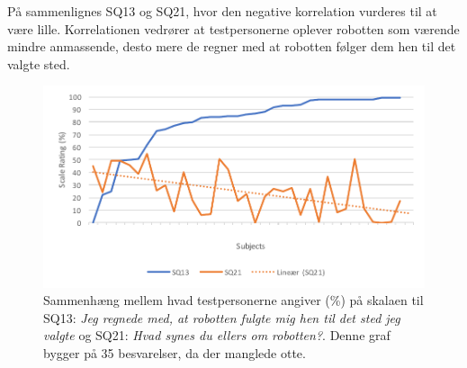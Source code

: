 \noindent
%
På  sammenlignes SQ13 og SQ21, hvor den negative korrelation vurderes til at være lille. Korrelationen vedrører at testpersonerne oplever robotten som værende mindre anmassende, desto mere de regner med at robotten følger dem hen til det valgte sted.
%
\begin{figure}[H]
	\centering
	\includegraphics[width=\textwidth]{Figure/Korrelationsgrafer/SQ13+SQ21}
	\caption{Sammenhæng mellem hvad testpersonerne angiver (\%) på skalaen til SQ13: \textit{Jeg regnede med, at robotten fulgte mig hen til det sted jeg valgte} og SQ21: \textit{Hvad synes du ellers om robotten?}. Denne graf bygger på 35 besvarelser, da der manglede otte.}
	\label{fig:SammenligningSQ13SQ21}
\end{figure}
\noindent
%
